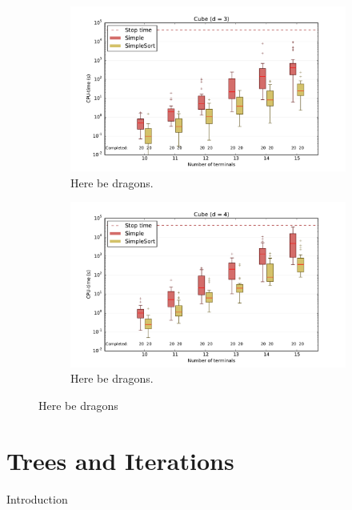 \begin{figure}[htbp]
  \centering
  \begin{subfigure}[t]{0.5\textwidth}
    \includegraphics[width=\textwidth]{gfx/boxplots/plot_nvst_boxplot_d3_Cube_3}
  \caption{Here be dragons.\label{fig:boxplot-d3-cube-3}}
  \end{subfigure}%
  \begin{subfigure}[t]{0.5\textwidth}
    \includegraphics[width=\textwidth]{gfx/boxplots/plot_nvst_boxplot_d4_Cube_3}
  \caption{Here be dragons.\label{fig:boxplot-d3-cube-3}}
  \end{subfigure}%
  \caption[Here be dragons]{Here be dragons\label{fig:boxplot-cube-3}}
\end{figure}

\section{Trees and Iterations}
\label{sec:trees-iterations}

Introduction

